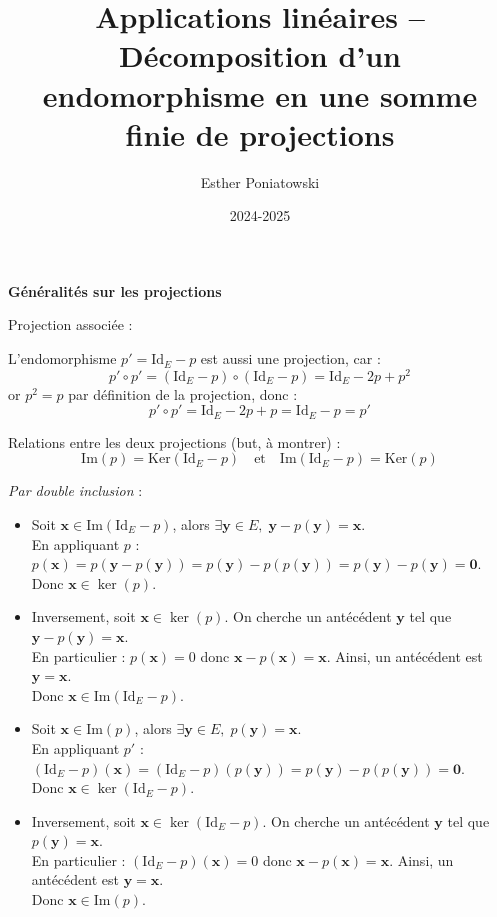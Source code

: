 \documentclass[10pt,a4paper]{article}
\title{Applications linéaires -- Décomposition d'un endomorphisme en une somme finie de projections}
\author{Esther Poniatowski}
\date{2024-2025}
\begin{document}
\bigskip
\textbf{Généralités sur les projections}

\q Projection associée :

L'endomorphisme $p' = \mathrm{Id}_E - p$ est aussi une projection, car :
\[
p' \circ p' = (\mathrm{Id}_E - p) \circ (\mathrm{Id}_E - p) = \mathrm{Id}_E - 2p + p^2
\]
or $p^2 = p$ par définition de la projection, donc :
\[
p' \circ p' = \mathrm{Id}_E - 2p + p = \mathrm{Id}_E - p = p'
\]

Relations entre les deux projections (but, à montrer) :
\[
\mathrm{Im}(p) = \mathrm{Ker}(\mathrm{Id}_E - p) \quad \text{et} \quad \mathrm{Im}(\mathrm{Id}_E - p) = \mathrm{Ker}(p)
\]

\emph{Par double inclusion} :
\begin{itemize}
    \item Soit $\mathbf{x} \in \mathrm{Im}(\mathrm{Id}_E - p)$, alors $\exists \mathbf{y} \in E, \; \mathbf{y} - p(\mathbf{y}) = \mathbf{x}$. \\
    En appliquant $p$ : $p(\mathbf{x}) = p(\mathbf{y} - p(\mathbf{y})) = p(\mathbf{y}) - p(p(\mathbf{y})) = p(\mathbf{y}) - p(\mathbf{y}) = \mathbf{0}$.\\
    Donc $\mathbf{x} \in \ker(p)$.
    \item Inversement, soit $\mathbf{x} \in \ker(p)$. On cherche un antécédent $\mathbf{y}$ tel que $\mathbf{y} - p(\mathbf{y}) = \mathbf{x}$.\\
    En particulier : $p(\mathbf{x}) = 0$ donc $\mathbf{x} - p(\mathbf{x}) = \mathbf{x}$. Ainsi, un antécédent est $\mathbf{y} = \mathbf{x}$.\\
    Donc $\mathbf{x} \in \mathrm{Im}(\mathrm{Id}_E - p)$.
    \item Soit $\mathbf{x} \in \mathrm{Im}(p)$, alors $\exists \mathbf{y} \in E, \; p(\mathbf{y}) = \mathbf{x}$. \\
    En appliquant $p'$ : $(\mathrm{Id}_E - p)(\mathbf{x}) = (\mathrm{Id}_E - p)(p(\mathbf{y})) = p(\mathbf{y}) - p(p(\mathbf{y})) =  \mathbf{0}$.\\
    Donc $\mathbf{x} \in \ker(\mathrm{Id}_E - p)$.
    \item Inversement, soit $\mathbf{x} \in \ker(\mathrm{Id}_E - p)$. On cherche un antécédent $\mathbf{y}$ tel que $p(\mathbf{y}) = \mathbf{x}$.\\
    En particulier : $(\mathrm{Id}_E - p)(\mathbf{x}) = 0$ donc $\mathbf{x} - p(\mathbf{x}) = \mathbf{x}$. Ainsi, un antécédent est $\mathbf{y} = \mathbf{x}$.\\
    Donc $\mathbf{x} \in \mathrm{Im}(p)$. \\
\end{itemize}
\end{document}

